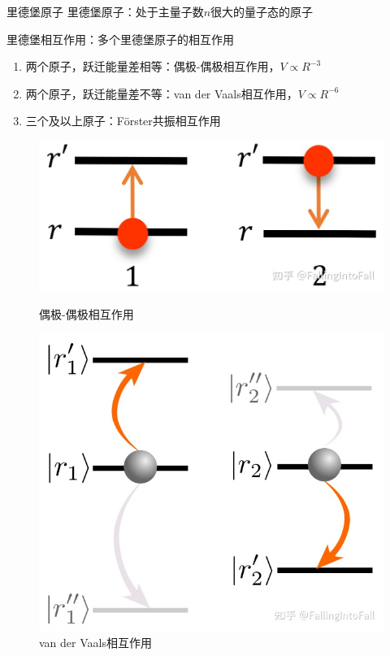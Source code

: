 \documentclass[10pt,aspectratio=43]{beamer}
\begin{document}
\begin{frame}{里德堡原子}
里德堡原子：处于主量子数$ n $很大的量子态的原子

里德堡相互作用：多个里德堡原子的相互作用
\begin{enumerate}
\item 两个原子，跃迁能量差相等：偶极-偶极相互作用，$ V\propto R^{-3} $
\item 两个原子，跃迁能量差不等：van der Vaals相互作用，$ V\propto R^{-6} $
\item 三个及以上原子：F\"orster共振相互作用
\end{enumerate}

\begin{figure}
\begin{minipage}{0.4\linewidth}
\centering
\includegraphics[width=\linewidth]{figures/v-dd}
\caption{偶极-偶极相互作用}
\label{fig:v-dd}
\end{minipage}
\qquad
\begin{minipage}{0.4\linewidth}
\centering
\includegraphics[width=0.8\linewidth]{figures/v-vdw}
\caption{van der Vaals相互作用}
\label{fig:v-vdw}
\end{minipage}
\end{figure}

\end{frame}
\end{document}
